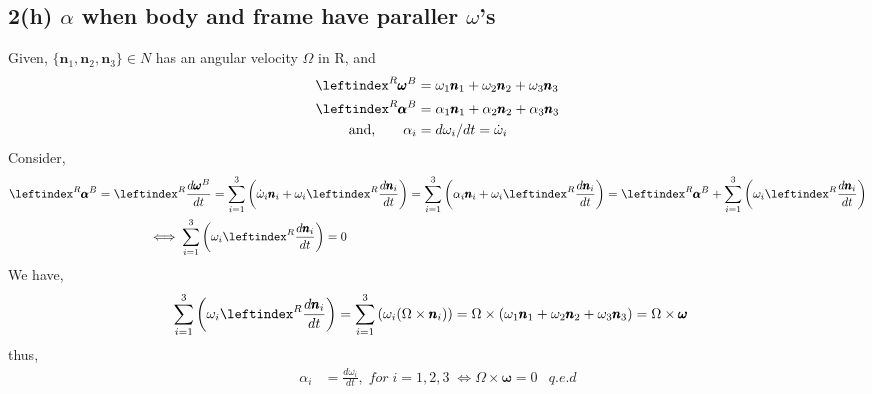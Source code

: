 \subsection{2(h) $\alpha$ when body and frame have paraller $\omega$'s}
Given, $\{\pmb n_1, \pmb n_2, \pmb n_3 \} \in N$ has an angular velocity $\Omega$ in R, and
\begin{align*}
    \lx{^R}{\pmb \omega}^B &= \omega_1 \pmb n_1 + \omega_2 \pmb n_2 + \omega_3 \pmb n_3\\
    \lx{^R}{\pmb \alpha}^B &= \alpha_1 \pmb n_1 + \alpha_2 \pmb n_2 + \alpha_3 \pmb n_3\\
    \text{and,}\qquad \alpha_i &= d \omega_i/dt = \dot \omega_i
\end{align*}
Consider,
\begin{align*}
    \lx{^R}{\pmb \alpha}^B &= \lx{^R}{\frac{d\pmb \omega^B}{dt}} =\sum_{i=1}^3 \left( \dot \omega_i\pmb n_i + \omega_i \lx{^R}{\frac{d\pmb n_i}{dt}} \right)
    = \sum_{i=1}^3 \left( \alpha_i \pmb n_i + \omega_i \lx{^R}{\frac{d\pmb n_i}{dt}} \right) = \lx{^R}{\pmb \alpha}^B + \sum_{i=1}^3 \left(\omega_i \lx{^R}{\frac{d\pmb n_i}{dt}} \right)\\
    &\qquad \qquad  \iff \sum_{i=1}^3 \left(\omega_i \lx{^R}{\frac{d\pmb n_i}{dt}} \right) = 0
\end{align*}
We have,
\begin{align*}
    \sum_{i=1}^3 \left(\omega_i \lx{^R}{\frac{d\pmb n_i}{dt}} \right) &
    = \sum_{i=1}^3 \left(\omega_i (\Omega \times \pmb n_i) \right)
    = \Omega \times ( \omega_1 \pmb n_1 + \omega_2 \pmb n_2 + \omega_3 \pmb n_3)
    = \Omega \times \pmb \omega
\end{align*}
thus,
\begin{align*}
    \alpha_i &=\frac{d \omega_i}{dt}, \; for \; i = 1,2,3 \; \iff \Omega \times \pmb \omega = 0 &q.e.d
\end{align*}
